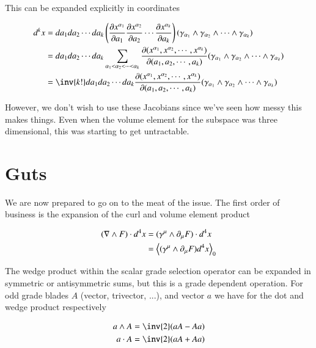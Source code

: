 This can be expanded explicitly in coordinates

\begin{align*}
d^k x 
&= da_1 da_2 \cdots da_k 
\left(
\PD{a_1}{x^{\alpha_1}} 
\PD{a_2}{x^{\alpha_2}} 
\cdots
\PD{a_k}{x^{\alpha_k}} 
\right)
( \gamma_{\alpha_1} \wedge \gamma_{\alpha_2} \wedge \cdots \wedge \gamma_{\alpha_k} ) \\
&= 
da_1 da_2 \cdots da_k 
\sum_{\alpha_1 < \alpha_2 < \cdots < \alpha_k}
\PD{(a_1, a_2, \cdots, a_k)}{(x^{\alpha_1}, x^{\alpha_2}, \cdots, x^{\alpha_k})}
( \gamma_{\alpha_1} \wedge \gamma_{\alpha_2} \wedge \cdots \wedge \gamma_{\alpha_k} ) \\
&= 
\inv{k!}
da_1 da_2 \cdots da_k
\PD{(a_1, a_2, \cdots, a_k)}{(x^{\alpha_1}, x^{\alpha_2}, \cdots, x^{\alpha_k})}
( \gamma_{\alpha_1} \wedge \gamma_{\alpha_2} \wedge \cdots \wedge \gamma_{\alpha_k} ) \\
\end{align*}

However, we don't wish to use these Jacobians since we've seen how messy this makes things.  Even when the volume element for the subspace was three dimensional, this was starting to get untractable.

\section{Guts}

We are now prepared to go on to the meat of the issue.  The first order of business is the expansion of the curl and volume element product

\begin{align*}
( \nabla \wedge F ) \cdot d^4 x
&=
( \gamma^\mu \wedge \partial_\mu F ) \cdot d^4 x \\
&=
{\left\langle{{ ( \gamma^\mu \wedge \partial_\mu F ) d^4 x }}\right\rangle}_{0} \\
\end{align*}

The wedge product within the scalar grade selection operator can be expanded in symmetric or antisymmetric sums, but this is a grade dependent operation.  For odd grade blades $A$ (vector, trivector, ...), and vector $a$ we have for the dot and wedge product respectively

\begin{align*}
a \wedge A = \inv{2} (a A - A a) \\
a \cdot A = \inv{2} (a A + A a)
\end{align*}

